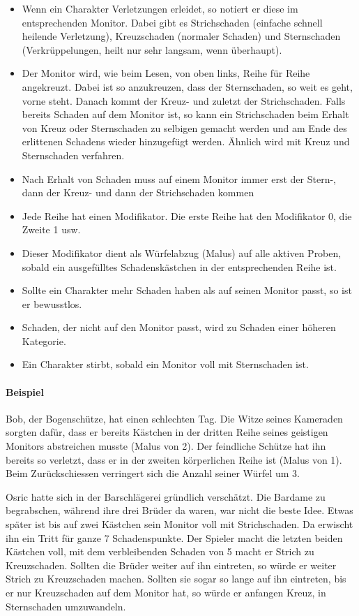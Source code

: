\documentclass{article}
\begin{document}
\begin{itemize}
\item Wenn ein Charakter Verletzungen erleidet, so notiert er diese im entsprechenden Monitor. Dabei gibt es Strichschaden (einfache schnell heilende Verletzung), Kreuzschaden (normaler Schaden) und Sternschaden (Verkrüppelungen, heilt nur sehr langsam, wenn überhaupt).
\item Der Monitor wird, wie beim Lesen, von oben links, Reihe für Reihe angekreuzt. Dabei ist so anzukreuzen, dass der Sternschaden, so weit es geht, vorne steht. Danach kommt der Kreuz- und zuletzt der Strichschaden. Falls bereits Schaden auf dem Monitor ist, so kann ein Strichschaden beim Erhalt von Kreuz oder Sternschaden zu selbigen gemacht werden und am Ende des erlittenen Schadens wieder hinzugefügt werden. Ähnlich wird mit Kreuz und Sternschaden verfahren.
\item Nach Erhalt von Schaden muss auf einem Monitor immer erst der Stern-, dann der Kreuz- und dann der Strichschaden kommen
\item Jede Reihe hat einen Modifikator. Die erste Reihe hat den Modifikator 0, die Zweite 1 usw.
\item Dieser Modifikator dient als Würfelabzug (Malus) auf alle aktiven Proben, sobald ein ausgefülltes Schadenskästchen in der entsprechenden Reihe ist.
\item Sollte ein Charakter mehr Schaden haben als auf seinen Monitor passt, so ist er bewusstlos.
\item Schaden, der nicht auf den Monitor passt, wird zu Schaden einer höheren Kategorie.
\item Ein Charakter stirbt, sobald ein Monitor voll mit Sternschaden ist.
\end{itemize}

\paragraph{Beispiel}

Bob, der Bogenschütze, hat einen schlechten Tag. Die Witze seines Kameraden sorgten dafür, dass er bereits Kästchen in
der dritten Reihe seines geistigen Monitors abstreichen musste (Malus von 2). Der feindliche Schütze hat ihn bereits
so verletzt, dass er in der zweiten körperlichen Reihe ist (Malus von 1). Beim Zurückschiessen verringert sich die
Anzahl seiner Würfel um 3.

Osric hatte sich in der Barschlägerei gründlich verschätzt. Die Bardame zu begrabschen, während ihre drei Brüder da
waren, war nicht die beste Idee. Etwas später ist bis auf zwei Kästchen sein Monitor voll mit Strichschaden. Da
erwischt ihn ein Tritt für ganze 7 Schadenspunkte. Der Spieler macht die letzten beiden Kästchen voll, mit dem
verbleibenden Schaden von 5 macht er Strich zu Kreuzschaden. Sollten die Brüder weiter auf ihn eintreten, so würde er
weiter Strich zu Kreuzschaden machen. Sollten sie sogar so lange auf ihn eintreten, bis er nur Kreuzschaden auf dem
Monitor hat, so würde er anfangen Kreuz, in Sternschaden umzuwandeln.
\end{document}
